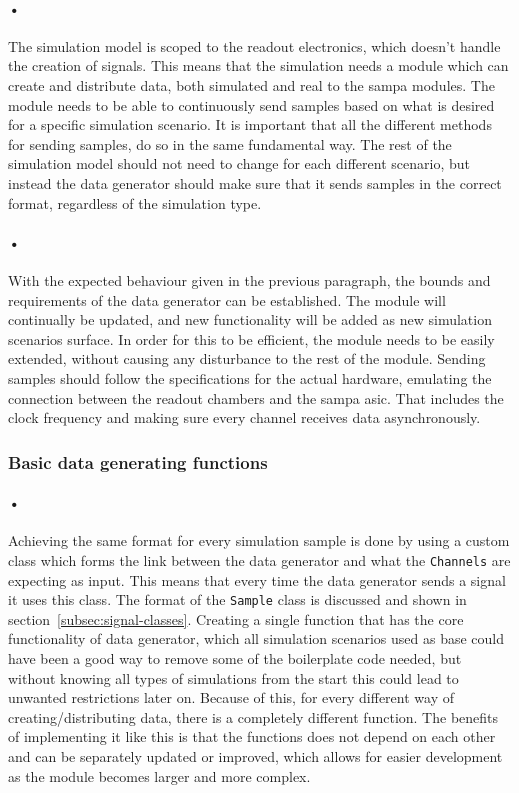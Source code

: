 \documentclass[a4paper, 12pt]{report}\dfrac{\right }{•}
\newcommand{\codeword}[1]{\texttt{#1}}
\begin{document}
\paragraph{•}
The simulation model is scoped to the readout electronics, which doesn't handle the creation of signals.
This means that the simulation needs a module which can create and distribute data, both simulated and real to the \gls{sampa} modules.
The module needs to be able to continuously send samples based on what is desired for a specific simulation scenario.
It is important that all the different methods for sending samples, do so in the same fundamental way.
The rest of the simulation model should not need to change for each different scenario, but instead the data generator should make sure that it sends samples in the correct format, regardless of the simulation type.

\paragraph{•}
With the expected behaviour given in the previous paragraph, the bounds and requirements of the data generator can be established.
The module will continually be updated, and new functionality will be added as new simulation scenarios surface. 
In order for this to be efficient, the module needs to be easily extended, without causing any disturbance to the rest of the module.
Sending samples should follow the specifications for the actual hardware, emulating the connection between the readout chambers and the \gls{sampa} asic.
That includes the clock frequency and making sure every channel receives data asynchronously.

\subsubsection{Basic data generating functions}

\paragraph{•}
Achieving the same format for every simulation sample is done by using a custom class which forms the link between the data generator and what the \codeword{Channels} are expecting as input.
This means that every time the data generator sends a signal it uses this class.
The format of the \codeword{Sample} class is discussed and shown in section~\ref{subsec:signal-classes}.
Creating a single function that has the core functionality of data generator, which all simulation scenarios used as base could have been a good way to remove some of the boilerplate code needed, but without knowing all types of simulations from the start this could lead to unwanted restrictions later on.
Because of this, for every different way of creating/distributing data, there is a completely different function.
The benefits of implementing it like this is that the functions does not depend on each other and can be separately updated or improved, which allows for easier development as the module becomes larger and more complex.
\end{document}

